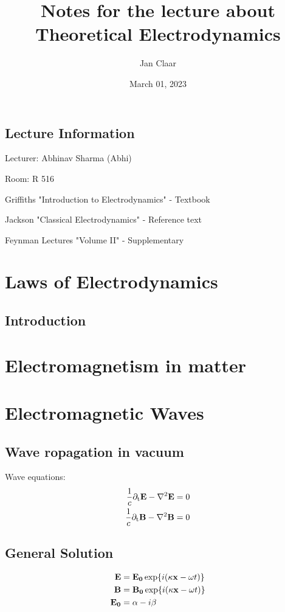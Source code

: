\documentclass[
    headings=optiontohead,              %
    12pt,                               %
    DIV=13,                             %
    twoside=false,                      %
    open=right,                         %
    BCOR=00mm,                          %
    toc=bibliographynumbered,            %
    parskip=half,                       %
    ]{scrreprt}
\title{Notes for the lecture about Theoretical Electrodynamics}
\author{Jan Claar}
\date{March 01, 2023}
\begin{document}
    \tableofcontents
    \newpage

    \section{Lecture Information} %
    \label{sec:Lecture Information}

    Lecturer: Abhinav Sharma (Abhi)
    
    Room: R 516

    Griffiths "Introduction to Electrodynamics" - Textbook

    Jackson "Classical Electrodynamics" - Reference text

    Feynman Lectures "Volume II" - Supplementary

            
    \chapter{Laws of Electrodynamics} %
    \label{cha:Laws of Electrodynamics}
    

    \section{Introduction} %
    \label{sec:Introduction}



    \chapter{Electromagnetism in matter} %
    \label{cha:Electromagnetism in matter}
    

    \chapter{Electromagnetic Waves} %
    \label{cha:Electromagnetic Waves}

    \section{Wave ropagation in vacuum}

    Wave equations:
    \begin{align}
        \frac{1}{c}\partial_\mathrm{t}\vb{E} - \nabla^2\vb{E} &= 0\\
        \frac{1}{c}\partial_\mathrm{t}\vb{B} - \nabla^2\vb{B} &= 0
    \end{align}

    \section{General Solution}

    \begin{align}
        \vb{E} &= \vb{E_0}\exp{i(\vb{\kappa} \vb{x} - \omega t)}\\
        \vb{B} &= \vb{B_0}\exp{i(\vb{\kappa} \vb{x} - \omega t)}\\
        \vb{E_0} &= \vb{\alpha} - i\vb{\beta}
    \end{align}

\end{document}
